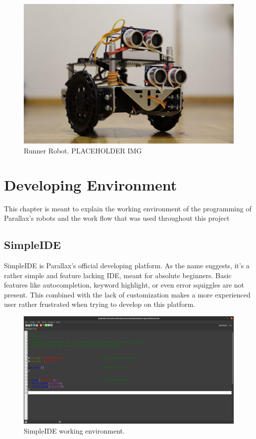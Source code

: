 \documentclass[sigconf,nonacm]{acmart}
\begin{document}
\begin{figure}[h]
    \centering
    \includegraphics[scale=0.1]{resources/Seeker_robot/4.jpeg}
    \caption{\label{fig:Runner}Runner Robot. PLACEHOLDER IMG}
\end{figure}

\section{Developing Environment}

      This chapter is meant to explain the working environment of the
      programming
      of Parallax's robots and the work flow that was used throughout this
      project
      

      \subsection{SimpleIDE}

      SimpleIDE is Parallax's official developing platform. As the name
      suggests, it's a rather simple and feature lacking IDE, meant for absolute
      beginners. Basic features like autocompletion, keyword highlight, or even
      error squiggles are not present. This combined with the lack of
      customization makes a more experienced user rather frustrated when trying
      to develop on this platform. 

      \begin{figure}[h]
            \centering
            \includegraphics[scale=0.1]{resources/simple_ide.png}
            \caption{\label{fig:simple_ide}SimpleIDE working environment.}
      \end{figure}
\end{document}
